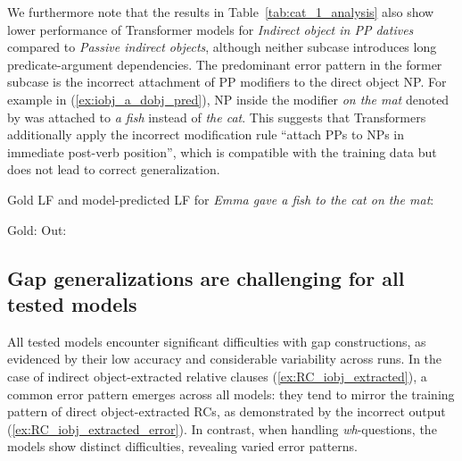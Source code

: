 We furthermore note that the results in Table~\ref{tab:cat_1_analysis} also show lower performance of Transformer models for \textit{Indirect object in PP datives} compared to \textit{Passive indirect objects}, although neither subcase introduces long predicate-argument dependencies. The predominant error pattern in the former subcase is the incorrect attachment of PP modifiers to the direct object NP. For example in (\ref{ex:iobj_a_dobj_pred}), NP inside the modifier \textit{on the mat} denoted by  was attached to \textit{a fish} instead of \textit{the cat}. This suggests that Transformers additionally apply the incorrect modification rule ``attach PPs to NPs in immediate post-verb position'', which is compatible with the training data but does not lead to correct generalization. 

\begin{exe}
\ex \label{ex:iobj_error} Gold LF and model-predicted LF for \textit{Emma gave a fish to the cat on the mat}:
    \begin{xlist}
        \small{
        \ex \label{ex:iobj_a_dobj_gold} Gold: 
    \ex \label{ex:iobj_a_dobj_pred} Out: 
    }
    \end{xlist}
\end{exe}


\subsection{Gap generalizations are challenging for all tested models} \label{subsec:am_parser_analysis}

All tested models encounter significant difficulties with gap constructions, as evidenced by their low accuracy and considerable variability across runs. In the case of indirect object-extracted relative clauses (\ref{ex:RC_iobj_extracted}), a common error pattern emerges across all models: they tend to mirror the training pattern of direct object-extracted RCs, as demonstrated by the incorrect output (\ref{ex:RC_iobj_extracted_error}). In contrast, when handling \emph{wh}-questions, the models show distinct difficulties, revealing varied error patterns.

